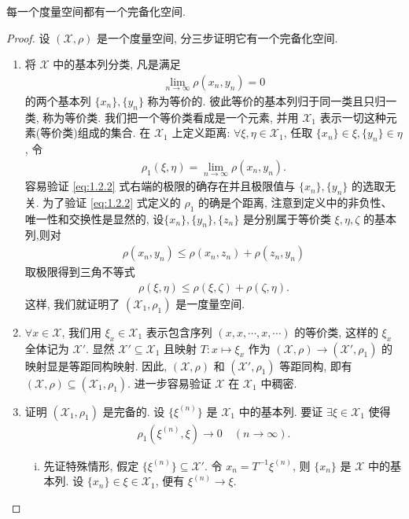 \documentclass[../../main.tex]{subfiles}%
\begin{document}
\begin{theorem}\label{theorem:每一个度量空间都有一个完备化空间}
每一个度量空间都有一个完备化空间.
\end{theorem}
\begin{proof}
设 $(\mathscr{X},\rho)$ 是一个度量空间, 分三步证明它有一个完备化空间.
\begin{enumerate}[(1)]
\item 将 $\mathscr{X}$ 中的基本列分类, 凡是满足
\begin{align*}
\lim\limits_{n\to\infty}\rho(x_n,y_n)=0
\end{align*}
的两个基本列 $\{x_n\},\{y_n\}$ 称为等价的. 彼此等价的基本列归于同一类且只归一类, 称为等价类. 我们把一个等价类看成是一个元素, 并用 $\mathscr{X}_1$ 表示一切这种元素(等价类)组成的集合. 在 $\mathscr{X}_1$ 上定义距离: $\forall\xi,\eta\in\mathscr{X}_1$, 任取 $\{x_n\}\in\xi,\{y_n\}\in\eta$, 令
\begin{align}
\rho_1(\xi,\eta)=\lim\limits_{n\to\infty}\rho(x_n,y_n).\label{eq:1.2.2}
\end{align}
容易验证 \eqref{eq:1.2.2} 式右端的极限的确存在并且极限值与 $\{x_n\},\{y_n\}$ 的选取无关. 为了验证 \eqref{eq:1.2.2} 式定义的 $\rho_1$ 的确是个距离, 注意到定义中的非负性、唯一性和交换性是显然的, 设$\{x_n\},\{y_n\},\{z_n\}$ 是分别属于等价类 $\xi,\eta,\zeta$ 的基本列,则对
\begin{align*}
\rho(x_n,y_n)\leqslant\rho(x_n,z_n)+\rho(z_n,y_n)
\end{align*}
取极限得到三角不等式
\begin{align*}
\rho(\xi,\eta)\leqslant\rho(\xi,\zeta)+\rho(\zeta,\eta).
\end{align*}
这样, 我们就证明了 $(\mathscr{X}_1,\rho_1)$ 是一度量空间.

\item $\forall x\in\mathscr{X}$, 我们用 $\xi_x\in\mathscr{X}_1$ 表示包含序列 $(x,x,\cdots,x,\cdots)$ 的等价类, 这样的 $\xi_x$ 全体记为 $\mathscr{X}'$. 显然 $\mathscr{X}'\subseteq\mathscr{X}_1$ 且映射 $T:x\mapsto\xi_x$ 作为 $(\mathscr{X},\rho)\to(\mathscr{X}',\rho_1)$ 的映射显是等距同构映射. 因此, $(\mathscr{X},\rho)$ 和 $(\mathscr{X}',\rho_1)$ 等距同构, 即有 $(\mathscr{X},\rho)\subseteq(\mathscr{X}_1,\rho_1)$. 进一步容易验证 $\mathscr{X}$ 在 $\mathscr{X}_1$ 中稠密.

\item 证明 $(\mathscr{X}_1,\rho_1)$ 是完备的. 设 $\{\xi^{(n)}\}$ 是 $\mathscr{X}_1$ 中的基本列. 要证 $\exists\xi\in\mathscr{X}_1$ 使得
\begin{align*}
\rho_1(\xi^{(n)},\xi)\to0\quad (n\to\infty).
\end{align*}
\begin{enumerate}[(i)]
\item 先证特殊情形, 假定 $\{\xi^{(n)}\}\subseteq\mathscr{X}'$. 令 $x_n=T^{-1}\xi^{(n)}$, 则 $\{x_n\}$ 是 $\mathscr{X}$ 中的基本列. 设 $\{x_n\}\in\xi\in\mathscr{X}_1$, 便有 $\xi^{(n)}\to\xi$.


\end{enumerate}
\end{enumerate}
\end{proof}
\end{document}
